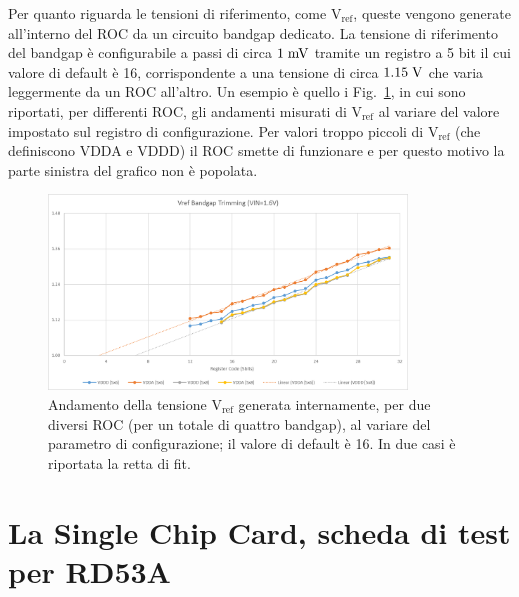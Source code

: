 Per quanto riguarda le tensioni di riferimento, come $\mathrm{V_{ref}}$, queste vengono generate all'interno del ROC da un circuito bandgap dedicato.
La tensione di riferimento del bandgap è configurabile a passi di circa $1\rm \; mV$ tramite un registro a 5 bit il cui valore di default \`e 16, corrispondente a una tensione di circa $1.15\rm \; V$ che varia leggermente da un ROC all'altro.
Un esempio è quello i Fig.~\ref{bandgap_trimming}, in cui sono riportati, per differenti ROC, gli andamenti misurati di $\mathrm{V_{ref}}$ al variare del valore impostato sul registro di configurazione. Per valori troppo piccoli di $\mathrm{V_{ref}}$ (che definiscono VDDA e VDDD) il ROC smette di funzionare e per questo motivo la parte sinistra del grafico non \`e popolata.
\begin{figure}
\centering
\includegraphics[width=0.85\textwidth]{Immagini/bandgap_trimming}
\caption{Andamento della tensione $\mathrm{V_{ref}}$ generata internamente, per due diversi ROC (per un totale di quattro bandgap), al variare del parametro di configurazione; il valore di default è 16. In due casi \`e riportata la retta di fit.}
\label{bandgap_trimming}
\end{figure}

\section{La Single Chip Card, scheda di test per RD53A}


